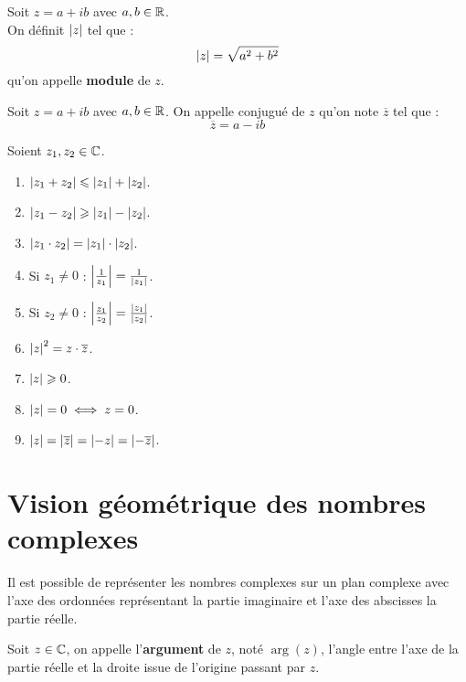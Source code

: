 \begin{definition}
    Soit $z = a + ib$ avec $a, b \in \mathbb{R}$. 
    \\
    On définit $\abs{z}$ tel que :
    \[ \abs{z} = \sqrt{a^2 + b^2} \]
    qu'on appelle \textbf{module} de $z$.
\end{definition}

\begin{definition}
    Soit $z = a + ib$ avec $a, b \in \mathbb{R}$. On appelle conjugué de $z$ qu'on note $\overline{z}$ tel que :
    \[ \overline{z} = a - ib \]
\end{definition}

\begin{proposition}
    Soient $z_1, z_2 \in \mathbb{C}$.
    \begin{enumerate}
            \item $\abs{z_1 + z_2} \leqslant \abs{z_1} + \abs{z_2}$.
            \item $\abs{z_1 - z_2} \geqslant \abs{z_1} - \abs{z_2}$.
            \item $\abs{z_1 \cdot z_2} = \abs{z_1} \cdot \abs{z_2}$.
            \item Si $z_1 \neq 0$ : $\abs{\frac{1}{z_1}} = \frac{1}{\abs{z_1}}$.
            \item Si $z_2 \neq 0$ : $\abs{\frac{z_1}{z_2}} = \frac{\abs{z_1}}{\abs{z_2}}$.
            \item $\abs{z}^2 = z \cdot \overline{z}$.
            \item $\abs{z} \geqslant 0$.
            \item $\abs{z} = 0 \iff z = 0$.
            \item $\abs{z} = \abs{\overline{z}} = \abs{-z} = \abs{-\overline{z}}$.
        \end{enumerate}
\end{proposition}

\section{Vision géométrique des nombres complexes}
Il est possible de représenter les nombres complexes sur un plan complexe avec l'axe des ordonnées représentant la partie imaginaire et l'axe des abscisses la partie réelle.

\begin{definition}
	Soit $z \in \mathbb{C}$, on appelle l'\textbf{argument} de $z$, noté $\arg(z)$, l'angle entre l'axe de la partie réelle et la droite issue de l'origine passant par $z$. 
\end{definition}

